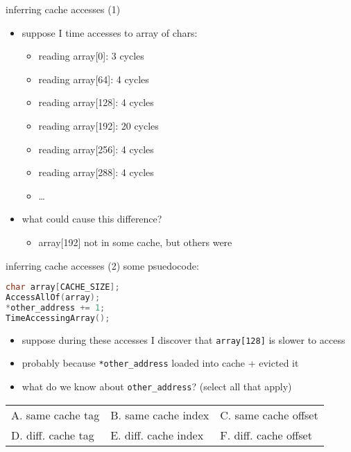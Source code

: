 \begin{frame}{inferring cache accesses (1)}
\begin{itemize}
\item suppose I time accesses to array of chars:
    \begin{itemize}
    \item reading array[0]: 3 cycles
    \item reading array[64]: 4 cycles
    \item reading array[128]: 4 cycles
    \item reading array[192]: 20 cycles
    \item reading array[256]: 4 cycles
    \item reading array[288]: 4 cycles
    \item \ldots
    \end{itemize}
\item what could cause this difference?
    \begin{itemize}
    \item array[192] not in some cache, but others were
    \end{itemize}
\end{itemize}
\end{frame}

\begin{frame}[fragile,label=cacheAccess]{inferring cache accesses (2)}
some psuedocode:
\begin{lstlisting}[language=C,style=smaller]
char array[CACHE_SIZE];
AccessAllOf(array);
*other_address += 1;
TimeAccessingArray();
\end{lstlisting}
\begin{itemize}
\item suppose during these accesses I discover that
    \texttt{array[128]} is slower to access
\item probably because \texttt{*other\_address} loaded into cache + evicted it
\item what do we know about \texttt{other\_address}? (select all that apply)
\end{itemize}
\small
\begin{tabular}{lll}
A. same cache tag & B. same cache index & C. same cache offset \\
D. diff. cache tag & E. diff. cache index & F. diff. cache offset \\
\end{tabular}
\end{frame}


